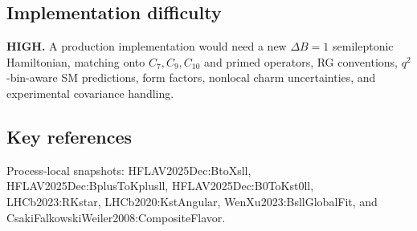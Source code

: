 \subsection*{Implementation difficulty}
\textbf{HIGH.}  A production implementation would need a new \(\Delta B=1\)
semileptonic Hamiltonian, matching onto \(C_7,C_9,C_{10}\) and primed
operators, RG conventions, \(q^2\)-bin-aware SM predictions, form factors,
nonlocal charm uncertainties, and experimental covariance handling.

\subsection*{Key references}
Process-local snapshots: HFLAV2025Dec:BtoXsll,
HFLAV2025Dec:BplusToKplusll, HFLAV2025Dec:B0ToKst0ll, LHCb2023:RKstar,
LHCb2020:KstAngular, WenXu2023:BsllGlobalFit, and
CsakiFalkowskiWeiler2008:CompositeFlavor.
